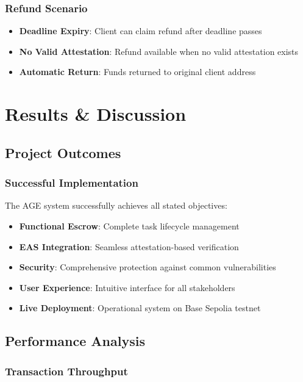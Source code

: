 \documentclass[12pt,a4paper]{article}
\begin{document}
\subsubsection{Refund Scenario}
\begin{itemize}
    \item \textbf{Deadline Expiry}: Client can claim refund after deadline passes
    \item \textbf{No Valid Attestation}: Refund available when no valid attestation exists
    \item \textbf{Automatic Return}: Funds returned to original client address
\end{itemize}

\section{Results \& Discussion}

\subsection{Project Outcomes}

\subsubsection{Successful Implementation}

The AGE system successfully achieves all stated objectives:
\begin{itemize}
    \item \textbf{Functional Escrow}: Complete task lifecycle management
    \item \textbf{EAS Integration}: Seamless attestation-based verification
    \item \textbf{Security}: Comprehensive protection against common vulnerabilities
    \item \textbf{User Experience}: Intuitive interface for all stakeholders
    \item \textbf{Live Deployment}: Operational system on Base Sepolia testnet
\end{itemize}

\subsection{Performance Analysis}

\subsubsection{Transaction Throughput}
\end{document}

